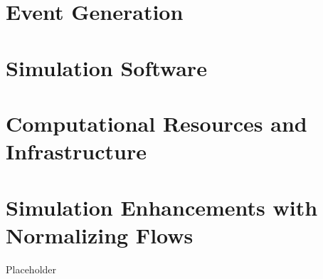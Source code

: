 \iffalse
Approaching through the lens of an inverse problem, we use existing knowledge to create event generators that produce reasonable the underlying physics processes. These computer generated datasets are then swam through microphysics simulations of the CLAS12 experiment on an event by event basis to produce a simulated dataset. By comparing the experimental data to the simulated data, and the simulated data to the model of the underlying distribution, inferences can be made about the true underlying distribution generating the experimental data. 
\todo{Fix this stupidly phrased section}
\fi


\section{Event Generation}\label{sec:ch3generator}
    
\clearpage

\section{Simulation Software}\label{sec:sim_pipeline}
 


\section{Computational Resources and Infrastructure}\label{sec:comp_infrastructure}
   
    



    

\clearpage

\section{Simulation Enhancements with Normalizing Flows}\label{sec:normflow}
    Placeholder




